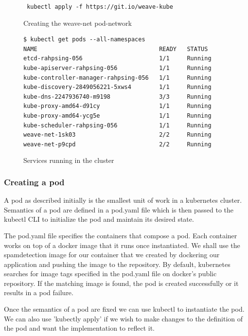 \documentclass[9pt,twocolumn,twoside]{../../styles/osajnl}
\begin{document}
\begin{figure}[H]
\begin{verbatim}
 kubectl apply -f https://git.io/weave-kube
\end{verbatim}
\caption{Creating the weave-net pod-network}
\label{Creating the weave-net pod-network}
\end{figure}

\begin{figure}[H]
\begin{verbatim}
$ kubectl get pods --all-namespaces
NAME                                   READY   STATUS       
etcd-rahpsing-056                      1/1     Running          
kube-apiserver-rahpsing-056            1/1     Running           
kube-controller-manager-rahpsing-056   1/1     Running           
kube-discovery-2849056221-5xws4        1/1     Running         
kube-dns-2247936740-m9198              3/3     Running           
kube-proxy-amd64-d91cy                 1/1     Running           
kube-proxy-amd64-ycg5e                 1/1     Running           
kube-scheduler-rahpsing-056            1/1     Running           
weave-net-1sk03                        2/2     Running           
weave-net-p9cpd                        2/2     Running           
\end{verbatim}
\caption{Services running in the cluster}
\label{Services running in the cluster}
\end{figure}

\subsubsection{Creating a pod}
A pod as described initially is the smallest unit of work in a
kubernetes cluster. Semantics of a pod are defined in a pod.yaml file
which is then passed to the kubectl CLI to initialize the pod and
maintain its desired state.

The pod.yaml file specifies the containers that compose a pod. Each
container works on top of a docker image that it runs once
instantiated. We shall use the spamdetection image for our container
that we created by dockering our application and pushing the image to
the repository. By default, kubernetes searches for image tags
specified in the pod.yaml file on docker's public repository. If the
matching image is found, the pod is created successfully or it results
in a pod failure.

Once the semantics of a pod are fixed we can use kubectl to
instantiate the pod. We can also use 'kubectly apply' if we wish to
make changes to the definition of the pod and want the implementation
to reflect it.
\end{document}
